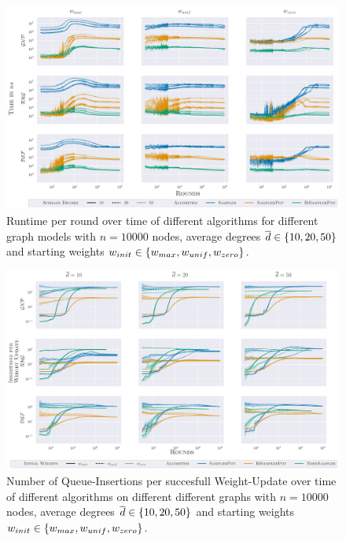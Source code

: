 \begin{figure}
  \centering
  \includegraphics[width=\textwidth]{Figures/experiments/Time_All.pdf}
  \caption{
    Runtime per round over time of different algorithms for different graph models with $n = 10000$ nodes, average degrees $\overline{d} \in \left\{10, 20, 50\right\}$ and starting weights $w_{init} \in \left\{w_{max}, w_{unif}, w_{zero}\right\}$.
  }
  \label{fig:app_time}
\end{figure}

\begin{figure}
  \centering
  \includegraphics[width=\textwidth]{Figures/experiments/InsPerWU_All.pdf}
  \caption{
    Number of Queue-Insertions per succesfull Weight-Update over time of different algorithms on different different graphs with $n = 10000$ nodes, average degrees $\overline{d} \in \left\{10, 20, 50\right\}$ and starting weights $w_{init} \in \left\{w_{max}, w_{unif}, w_{zero}\right\}$.
  }
  \label{fig:app_ins_per_wu}
\end{figure}

